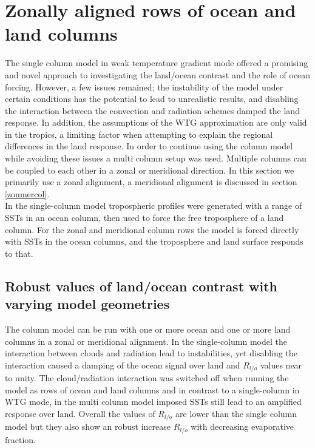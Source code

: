 \clearpage

\section{Zonally aligned rows of ocean and land columns}

The single column model in weak temperature gradient mode offered a promising 
and novel approach to investigating the land/ocean contrast and the role of 
ocean forcing.  However, a few issues remained; the instability of the model 
under certain conditions has the potential to lead to unrealistic results, and 
disabling the interaction between the convection and radiation schemes damped  
the land response. In addition, the assumptions of the WTG approximation are 
only valid in the tropics, a limiting factor when attempting to explain the 
regional differences in the land response. In order to continue using the column 
model while avoiding these issues a multi column setup was used. Multiple 
columns can be coupled to each other in a zonal or meridional direction. In this 
section we primarily use a zonal alignment, a meridional alignment is discussed 
in section \ref{zonmercol}.\\
In the single-column model tropospheric profiles were generated with a range of 
SSTs in an ocean column, then used to force the free troposphere of a land 
column. For the zonal and meridional column rows the model is forced directly 
with SSTs in the ocean columns, and the troposphere and land surface responds to 
that. 

\subsection{Robust values of land/ocean contrast with varying model geometries}

The column model can be run with one or more ocean and one or more land columns 
in a zonal or meridional alignment. In the single-column model the interaction 
between clouds and radiation lead to instabilities, yet disabling the 
interaction caused a damping of the ocean signal over land and $R_{l/o}$ values 
near to unity. The cloud/radiation interaction was switched off when running the 
model as rows of ocean and land columns and in contrast to a single-column in 
WTG mode, in the multi column model imposed SSTs still lead to an amplified 
response over land. Overall the values of $R_{l/o}$ are lower than the single 
column model but they also show an robust increase $R_{l/o}$ with decreasing 
evaporative fraction.   

